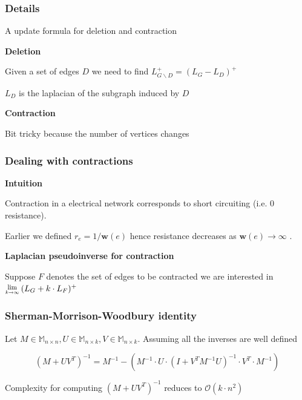 \documentclass{beamer}
\newcommand{\laplacian}[1][G]{\ensuremath{L_{#1}^{+}}}
\newcommand{\Lim}[1]{\raisebox{0.5ex}{\scalebox{0.8}{$\displaystyle \lim_{#1}\;$}}}
\begin{document}
\begin{frame}
\frametitle{Details}

A update formula for deletion and contraction

\leavevmode\hphantom{ }
\leavevmode\hphantom{ }

\pause
\large\textbf{Deletion}

\leavevmode\hphantom{ }

Given a set of edges $D$ we need to find $\laplacian[G \backslash D] = (L_G - L_D)^+$ 

$L_D$ is the laplacian of the subgraph induced by $D$


\leavevmode\hphantom{ }

\pause
\large\textbf{Contraction}

\leavevmode\hphantom{ }

Bit tricky because the number of vertices changes

\end{frame}


\begin{frame}
 \frametitle{Dealing with contractions}
 
 \textbf{Intuition} 
 
  \leavevmode\hphantom{ }
 \leavevmode\hphantom{ }
 
 Contraction in a electrical network corresponds to short circuiting (i.e. 0 resistance). 
 
 \leavevmode\hphantom{ }
 \leavevmode\hphantom{ }
 
 Earlier we defined $r_e = 1 / \textbf{w}(e)$ hence resistance decreases as $\textbf{w}(e) \to \infty$ .
 
 
 \leavevmode\hphantom{ }
 \leavevmode\hphantom{ }
 
 \textbf{Laplacian pseudoinverse for contraction}
 
 \leavevmode\hphantom{ }
 \leavevmode\hphantom{ }
 
 Suppose $F$ denotes the set of edges to be contracted we are interested in $\Lim{k \to \infty} (L_G + k \cdot L_F)^+$
 
 
 
\end{frame}

\begin{frame}
 \frametitle{Sherman-Morrison-Woodbury identity}
 
 \begin{Lemma}
  Let $ M \in \mathbb{M}_{n \times n} , U \in \mathbb{M}_{n \times k}, V \in \mathbb{M}_{n \times k}$. Assuming all the inverses are well defined 
  
 $$ (M + UV^T)^{-1} = M^{-1} - \left( M^{-1} \cdot U \cdot (I + V^TM^{-1}U)^{-1} \cdot V^T \cdot M^{-1}\right) $$
 
 \end{Lemma}

 Complexity for computing $(M + UV^T)^{-1}$ reduces to $\mathcal{O}(k \cdot n^2)$
 
\end{frame}
\end{document}
